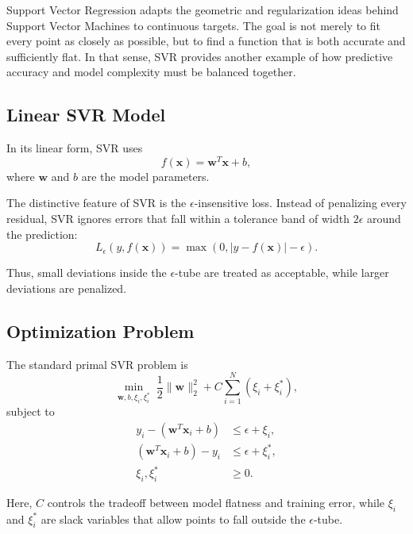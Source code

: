 \documentclass[12pt]{article}
\begin{document}
Support Vector Regression adapts the geometric and regularization ideas behind Support Vector Machines to continuous targets. The goal is not merely to fit every point as closely as possible, but to find a function that is both accurate and sufficiently flat. In that sense, SVR provides another example of how predictive accuracy and model complexity must be balanced together.

\subsection{Linear SVR Model}

In its linear form, SVR uses
\begin{equation}
f(\mathbf{x}) = \mathbf{w}^T\mathbf{x} + b,
\end{equation}
where $\mathbf{w}$ and $b$ are the model parameters.

The distinctive feature of SVR is the $\epsilon$-insensitive loss. Instead of penalizing every residual, SVR ignores errors that fall within a tolerance band of width $2\epsilon$ around the prediction:
\begin{equation}
L_{\epsilon}(y, f(\mathbf{x})) = \max\left(0, |y - f(\mathbf{x})| - \epsilon\right).
\end{equation}

Thus, small deviations inside the $\epsilon$-tube are treated as acceptable, while larger deviations are penalized.

\subsection{Optimization Problem}

The standard primal SVR problem is
\begin{equation}
\min_{\mathbf{w},b,\xi_i,\xi_i^*} \; \frac{1}{2}\|\mathbf{w}\|_2^2 + C\sum_{i=1}^N (\xi_i + \xi_i^*),
\end{equation}
subject to
\begin{align}
 y_i - (\mathbf{w}^T\mathbf{x}_i + b) &\leq \epsilon + \xi_i, \\
 (\mathbf{w}^T\mathbf{x}_i + b) - y_i &\leq \epsilon + \xi_i^*, \\
 \xi_i,\xi_i^* &\geq 0.
\end{align}

Here, $C$ controls the tradeoff between model flatness and training error, while $\xi_i$ and $\xi_i^*$ are slack variables that allow points to fall outside the $\epsilon$-tube.
\end{document}
